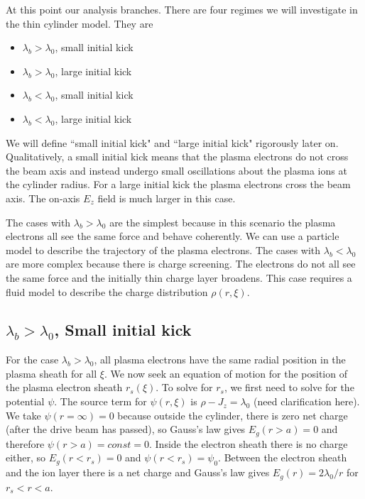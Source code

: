 \documentclass[aps,prl,preprint,groupedaddress]{revtex4-1}
\begin{document}
At this point our analysis branches. There are four regimes we will investigate in the thin cylinder model. They are

\begin{itemize}
\item $\lambda_b > \lambda_0$, small initial kick
\item $\lambda_b > \lambda_0$, large initial kick
\item $\lambda_b < \lambda_0$, small initial kick
\item $\lambda_b < \lambda_0$, large initial kick
\end{itemize}

We will define ``small initial kick" and ``large initial kick" rigorously later on. Qualitatively, a small initial kick means that the plasma electrons do not cross the beam axis and instead undergo small oscillations about the plasma ions at the cylinder radius. For a large initial kick the plasma electrons cross the beam axis. The on-axis $E_z$ field is much larger in this case.

The cases with $\lambda_b > \lambda_0$ are the simplest because in this scenario the plasma electrons all see the same force and behave coherently. We can use a particle model to describe the trajectory of the plasma electrons. The cases with $\lambda_b < \lambda_0$ are more complex because there is charge screening. The electrons do not all see the same force and the initially thin charge layer broadens. This case requires a fluid model to describe the charge distribution $\rho(r,\xi)$.







\subsection{$\lambda_b > \lambda_0$, Small initial kick}

For the case $\lambda_b > \lambda_0$, all plasma electrons have the same radial position in the plasma sheath for all $\xi$. We now seek an equation of motion for the position of the plasma electron sheath $r_s(\xi)$. To solve for $r_s$, we first need to solve for the potential $\psi$. The source term for $\psi(r,\xi)$ is $\rho - J_z = \lambda_0$ (need clarification here). We take $\psi(r=\infty) = 0$ because outside the cylinder, there is zero net charge (after the drive beam has passed), so Gauss's law gives $E_g(r > a) = 0$ and therefore $\psi(r > a) = const = 0$. Inside the electron sheath there is no charge either, so $E_g(r < r_s) = 0$ and $\psi(r < r_s) = \psi_0$. Between the electron sheath and the ion layer there is a net charge and Gauss's law gives $E_g(r) = 2\lambda_0/r$ for $r_s < r < a$. 
\end{document}
